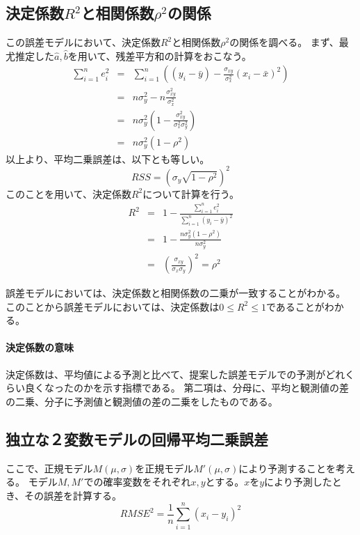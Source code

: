 \subsection{決定係数$R^2$と相関係数$\rho^2$の関係}
この誤差モデルにおいて、決定係数$R^2$と相関係数$\rho^2$の関係を調べる。
まず、最尤推定した$\hat{a},\hat{b}$を用いて、残差平方和の計算をおこなう。
\begin{eqnarray*}
 \sum_{i=1}^n e_i^2 &=&  \sum_{i=1}^n ((y_i-\bar{y})-\frac{\sigma_{xy}}{\sigma^2_x}(x_i-\bar{x})^2)\\
 &=& n\sigma^2_y -n \frac{\sigma^2_{xy}}{\sigma_x^2} \\
 &=& n\sigma_y^2(1-\frac{\sigma^2_{xy}}{\sigma^2_x\sigma_y^2}) \\
 &=& n\sigma_y^2(1-\rho^2)
\end{eqnarray*}
以上より、平均二乗誤差は、以下とも等しい。
\begin{equation*}
 RSS = (\sigma_y\sqrt{1-\rho^2})^2
\end{equation*}
このことを用いて、決定係数$R^2$について計算を行う。
\begin{eqnarray*}
 R^2 &=& 1-\frac{\sum_{i=1}^n e_i^2}{\sum_{i=1}^n (y_i-\bar{y})^2} \\
 &=& 1-\frac{n\sigma_y^2(1-\rho^2)}{n\sigma^2_y} \\
 &=& \left( \frac{\sigma_{xy}}{\sigma_x\sigma_y}\right)^2 = \rho^2
\end{eqnarray*}

誤差モデルにおいては、決定係数と相関係数の二乗が一致することがわかる。
このことから誤差モデルにおいては、決定係数は$0\leq R^2\leq 1$であることがわかる。

\paragraph{決定係数の意味}
決定係数は、平均値による予測と比べて、提案した誤差モデルでの予測がどれくらい良くなったのかを示す指標である。
第二項は、分母に、平均と観測値の差の二乗、分子に予測値と観測値の差の二乗をしたものである。

\subsection{独立な２変数モデルの回帰平均二乗誤差}
ここで、正規モデル$M(\mu,\sigma)$を正規モデル$M'(\mu,\sigma)$により予測することを考える。
モデル$M,M'$での確率変数をそれぞれ$x,y$とする。$x$を$y$により予測したとき、その誤差を計算する。
\begin{equation*}
 RMSE^2 = \frac{1}{n}\sum_{i=1}^n (x_i-y_i)^2
\end{equation*}

